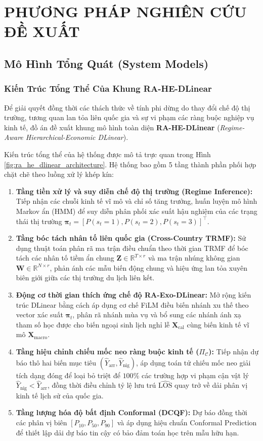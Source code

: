 \chapter{PHƯƠNG PHÁP NGHIÊN CỨU ĐỀ XUẤT}
\label{ch:proposed_method}

\section{Mô Hình Tổng Quát (System Models)}
\label{sec:system_models}

\subsection{Kiến Trúc Tổng Thể Của Khung RA-HE-DLinear}
Để giải quyết đồng thời các thách thức về tính phi dừng do thay đổi chế độ thị trường, tương quan lan tỏa liên quốc gia và sự vi phạm các ràng buộc nghiệp vụ kinh tế, đồ án đề xuất khung mô hình toàn diện \textbf{RA-HE-DLinear} (\textit{Regime-Aware Hierarchical-Economic DLinear}). 

Kiến trúc tổng thể của hệ thống được mô tả trực quan trong Hình \ref{fig:ra_he_dlinear_architecture}. Hệ thống bao gồm 5 tầng thành phần phối hợp chặt chẽ theo luồng xử lý khép kín:
\begin{enumerate}
    \item \textbf{Tầng tiền xử lý và suy diễn chế độ thị trường (Regime Inference):} Tiếp nhận các chuỗi kinh tế vĩ mô và chỉ số tăng trưởng, huấn luyện mô hình Markov ẩn (HMM) để suy diễn phân phối xác suất hậu nghiệm của các trạng thái thị trường $\bm{\pi}_t = [P(s_t = 1), P(s_t = 2), P(s_t = 3)]^\top$.
    \item \textbf{Tầng bóc tách nhân tố liên quốc gia (Cross-Country TRMF):} Sử dụng thuật toán phân rã ma trận điều chuẩn theo thời gian TRMF để bóc tách các nhân tố tiềm ẩn chung $\mathbf{Z} \in \mathbb{R}^{T \times r}$ và ma trận nhúng không gian $\mathbf{W} \in \mathbb{R}^{N \times r}$, phản ánh các mẫu biến động chung và hiệu ứng lan tỏa xuyên biên giới giữa các thị trường du lịch liên kết.
    \item \textbf{Động cơ thời gian thích ứng chế độ RA-Exo-DLinear:} Mở rộng kiến trúc DLinear bằng cách áp dụng cơ chế FiLM điều biến nhánh xu thế theo vector xác suất $\bm{\pi}_t$, phân rã nhánh mùa vụ và bổ sung các nhánh ánh xạ tham số học được cho biến ngoại sinh lịch nghỉ lễ $\mathbf{X}_{\text{cal}}$ cùng biến kinh tế vĩ mô $\mathbf{X}_{\text{macro}}$.
    \item \textbf{Tầng hiệu chỉnh chiếu mốc neo ràng buộc kinh tế ($\Pi_{\mathcal{C}}$):} Tiếp nhận dự báo thô hai biến mục tiêu $(\hat{Y}_{\text{arr}}, \hat{Y}_{\text{nig}})$, áp dụng toán tử chiếu mốc neo giải tích dạng đóng để loại bỏ triệt để $100\%$ các trường hợp vi phạm cận vật lý $\hat{Y}_{\text{nig}} < \hat{Y}_{\text{arr}}$, đồng thời điều chỉnh tỷ lệ lưu trú $\widehat{\text{LOS}}$ quay trở về dải phân vị kinh tế lịch sử của quốc gia.
    \item \textbf{Tầng lượng hóa độ bất định Conformal (DCQF):} Dự báo đồng thời các phân vị biên $[P_{10}, P_{50}, P_{90}]$ và áp dụng hiệu chuẩn Conformal Prediction để thiết lập dải dự báo tin cậy có bảo đảm toán học trên mẫu hữu hạn.
\end{enumerate}

